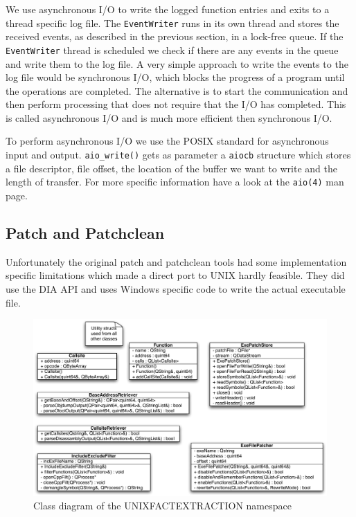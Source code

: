 We use asynchronous I/O to write the logged function entries and exits to a thread specific log file. The \verb=EventWriter= runs in its own thread and stores the received events, as described in the previous section, in a lock-free queue. If the \verb=EventWriter= thread is scheduled we check if there are any events in the queue and write them to the log file. A very simple approach to write the events to the log file would be synchronous I/O, which blocks the progress of a program until the operations are completed. The alternative is to start the communication and then perform processing that does not require that the I/O has completed. This is called asynchronous I/O and is much more efficient then synchronous I/O.

To perform asynchronous I/O we use the POSIX standard for asynchronous input and output. \verb=aio_write()= gets as parameter a \verb=aiocb= structure which stores a file descriptor, file offset, the location of the buffer we want to write and the length of transfer. For more specific information have a look at the \verb=aio(4)= man page.

\subsection{Patch and Patchclean}

Unfortunately the original patch and patchclean tools had some implementation specific limitations which made a direct port to UNIX hardly feasible.  They did use the DIA API and  uses Windows specific code to write the actual executable file.

\begin{figure}[ht]
\centering
\includegraphics[width=16cm]{images/unixpatchtools}
\caption{Class diagram of the UNIXFACTEXTRACTION namespace} \label{fig:unixfe_unixfe}
\end{figure}

